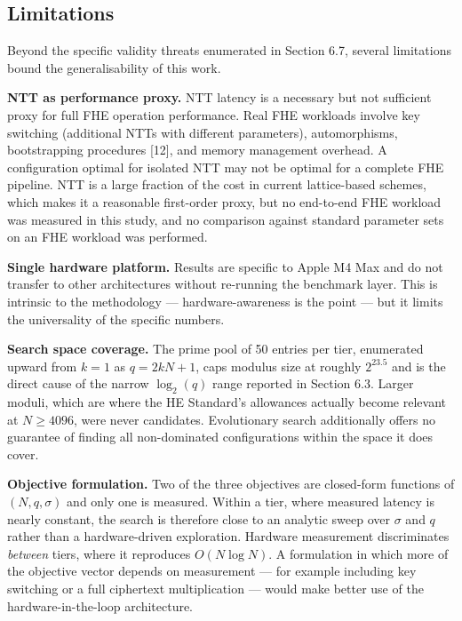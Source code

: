\subsection{Limitations}\label{limitations}

Beyond the specific validity threats enumerated in Section 6.7, several limitations bound the generalisability of this work.

\textbf{NTT as performance proxy.} NTT latency is a necessary but not sufficient proxy for full FHE operation performance. Real FHE workloads involve key switching (additional NTTs with different parameters), automorphisms, bootstrapping procedures [12], and memory management overhead. A configuration optimal for isolated NTT may not be optimal for a complete FHE pipeline. NTT is a large fraction of the cost in current lattice-based schemes, which makes it a reasonable first-order proxy, but no end-to-end FHE workload was measured in this study, and no comparison against standard parameter sets on an FHE workload was performed.

\textbf{Single hardware platform.} Results are specific to Apple M4 Max and do not transfer to other architectures without re-running the benchmark layer. This is intrinsic to the methodology --- hardware-awareness is the point --- but it limits the universality of the specific numbers.

\textbf{Search space coverage.} The prime pool of 50 entries per tier, enumerated upward from \(k = 1\) as \(q = 2kN + 1\), caps modulus size at roughly \(2^{23.5}\) and is the direct cause of the narrow \(\log_2(q)\) range reported in Section 6.3. Larger moduli, which are where the HE Standard's allowances actually become relevant at \(N \geq 4096\), were never candidates. Evolutionary search additionally offers no guarantee of finding all non-dominated configurations within the space it does cover.

\textbf{Objective formulation.} Two of the three objectives are closed-form functions of \((N, q, \sigma)\) and only one is measured. Within a tier, where measured latency is nearly constant, the search is therefore close to an analytic sweep over \(\sigma\) and \(q\) rather than a hardware-driven exploration. Hardware measurement discriminates \emph{between} tiers, where it reproduces \(O(N \log N)\). A formulation in which more of the objective vector depends on measurement --- for example including key switching or a full ciphertext multiplication --- would make better use of the hardware-in-the-loop architecture.

